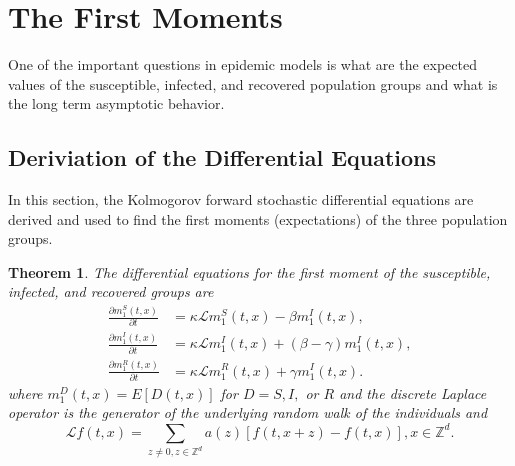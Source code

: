 \documentclass[sn-basic]{sn-jnl}%
\theoremstyle{thmstyleone}%
\newtheorem{theorem}{Theorem}%
\theoremstyle{thmstyletwo}%
\theoremstyle{thmstylethree}%
\numberwithin{equation}{theorem}
\begin{document}
\section{The First Moments}

One of the important questions in epidemic models is what are the expected values of the susceptible, infected, and recovered population groups and what is the long term asymptotic behavior. 

\subsection{Deriviation of the Differential Equations}
In this section, the Kolmogorov forward stochastic differential equations are derived and used to find the first moments (expectations) of the three population groups.

\begin{theorem}\label{thm: differential equations first moment}
The differential equations for the first moment of the susceptible, infected, and recovered groups are 
\begin{align}\label{eq: diff eq first moment sus}
\displaystyle \frac{\partial m_{1}^{S}(t,x)}{\partial t} &= \kappa \mathcal{L} m_{1}^{S}(t,x) - \beta m_{1}^{I}(t,x),\\
\label{eq: diff eq first moment inf}
\displaystyle \frac{\partial m_{1}^{I}(t,x)}{\partial t} &= \kappa \mathcal{L} m_{1}^{I}(t,x) + (\beta - \gamma) m_{1}^{I}(t,x),\\
\label{eq: diff eq first moment rec}
\displaystyle \frac{\partial m_{1}^{R}(t,x)}{\partial t} &= \kappa \mathcal{L} m_{1}^{R}(t,x) + \gamma m_{1}^{I}(t,x).
\end{align}
where $m_{1}^{D}(t,x) = E[D(t,x)]$ for $D= S, I,$ or $R$ and the discrete Laplace operator is the generator of the underlying random walk of the individuals and $$\mathcal{L}f(t,x) = \sum\limits_{z \neq 0, z \in \mathbb{Z}^{d}} a(z)[f(t, x+z)- f(t,x)], x \in \mathbb{Z}^{d}.$$
\end{theorem}
\end{document}
